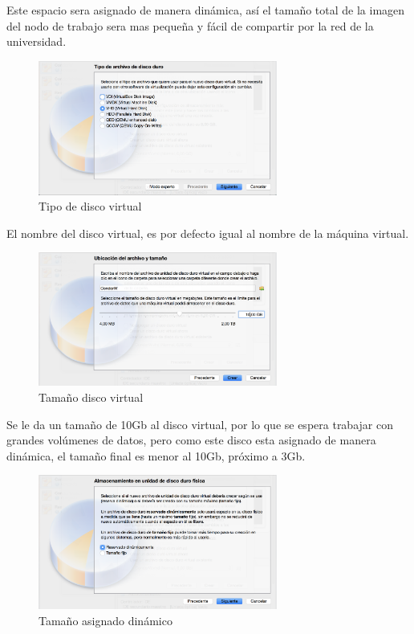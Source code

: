 Este espacio sera asignado de manera dinámica, así el tamaño total de la imagen del nodo de trabajo sera mas pequeña y fácil de compartir por la red de la universidad.
\begin{figure}[h]
\centering
\includegraphics[width=0.7\textwidth]{vbox/vdtype.png}
\decoRule
\caption{Tipo de disco virtual}
\label{fig:hd type}
\end{figure}
\FloatBarrier

El nombre del disco virtual, es por defecto igual al nombre de la máquina virtual.

\begin{figure}[h]
\centering
\includegraphics[width=0.7\textwidth]{vbox/vhdsize.png}
\decoRule
\caption{Tamaño disco virtual}
\label{fig:hd size}
\end{figure}
\FloatBarrier
Se le da un tamaño de 10Gb al disco virtual, por lo que se espera trabajar con grandes volúmenes de datos, pero como este disco esta asignado de manera dinámica, el tamaño final es menor al 10Gb, próximo a 3Gb.
\begin{figure}[h]
\centering
\includegraphics[width=0.7\textwidth]{vbox/dynamicvhd.png}
\decoRule
\caption{Tamaño asignado dinámico}
\label{fig:dynamic size}
\end{figure}
\FloatBarrier

